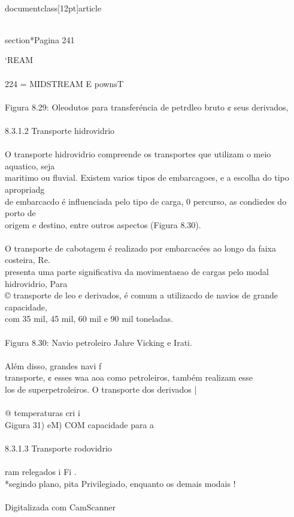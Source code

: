 \\documentclass[12pt]{article}
\begin{document}
\\section*{Pagina 241}

‘REAM\\
\\
224 = MIDSTREAM E pownsT\\
\\
Figura 8.29: Oleodutos para transferéncia de petrdleo bruto ¢ seus derivados,\\
\\
8.3.1.2 Transporte hidrovidrio\\
\\
O transporte hidrovidrio compreende os transportes que utilizam o meio aquatico, seja\\
maritimo ou fluvial. Existem varios tipos de embarcagoes, e a escolha do tipo apropriadg\\
de embarcacdo é influenciada pelo tipo de carga, 0 percurso, as condi¢des do porto de\\
origem e destino, entre outros aspectos (Figura 8.30).\\
\\
O transporte de cabotagem é realizado por embarcacées ao longo da faixa costeira, Re.\\
presenta uma parte significativa da movimenta¢ao de cargas pelo modal hidrovidrio, Para\\
© transporte de leo e derivados, é comum a utilizacdo de navios de grande capacidade,\\
com 35 mil, 45 mil, 60 mil e 90 mil toneladas.\\
\\
Figura 8.30: Navio petroleiro Jahre Vicking e Irati.\\
\\
Além disso, grandes navi f\\
transporte, ¢ esses waa aoa como petroleiros, também realizam esse\\
los de superpetroleiros. O transporte dos derivados |\\
\\
@ temperaturas cri i\\
Gigura 31) eM) COM capacidade para a\\
\\
8.3.1.3 Transporte rodovidrio\\
\\
ram relegados i Fi .\\
*segindo plano, pita Privilegiado, enquanto os demais modais !\\
\\
Digitalizada com CamScanner\\
\end{document}
